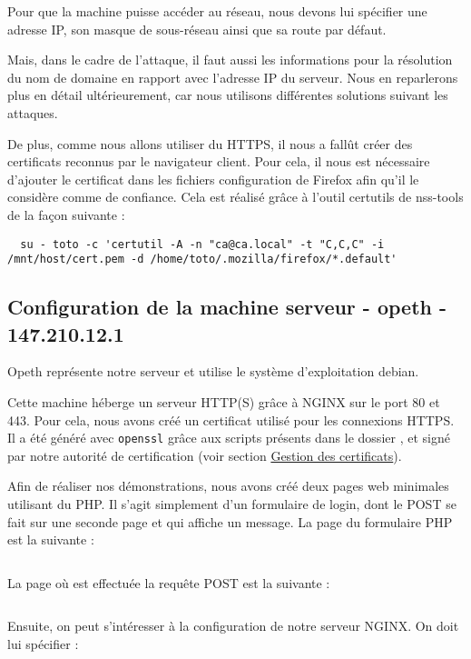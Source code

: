 Pour que la machine puisse accéder au réseau, nous devons lui spécifier une adresse IP, son masque de sous-réseau ainsi que sa route par défaut.

Mais, dans le cadre de l'attaque, il faut aussi les informations pour la résolution du nom de domaine en rapport avec l'adresse IP du serveur. Nous en reparlerons plus en détail ultérieurement, car nous utilisons différentes solutions suivant les attaques.

De plus, comme nous allons utiliser du HTTPS, il nous a fallût créer des certificats reconnus par le navigateur client. Pour cela, il nous est nécessaire d'ajouter le certificat dans les fichiers configuration de Firefox afin qu'il le considère comme de confiance. Cela est réalisé grâce à l'outil certutils de nss-tools de la façon suivante :

\begin{verbatim}
  su - toto -c 'certutil -A -n "ca@ca.local" -t "C,C,C" -i /mnt/host/cert.pem -d /home/toto/.mozilla/firefox/*.default'
\end{verbatim}

\subsection{Configuration de la machine serveur - opeth - 147.210.12.1}

Opeth représente notre serveur et utilise le système d'exploitation debian.

Cette machine héberge un serveur HTTP(S) grâce à NGINX sur le port 80 et 443. Pour cela, nous avons créé un certificat utilisé pour les connexions HTTPS. Il a été généré avec \verb+openssl+ grâce aux scripts présents dans le dossier , et signé par notre autorité de certification (voir section \hyperref[sec:certificats]{Gestion des certificats}).

Afin de réaliser nos démonstrations, nous avons créé deux pages web minimales utilisant du PHP. Il s'agit simplement d'un formulaire de login, dont le POST se fait sur une seconde page et qui affiche un message. La page du formulaire PHP est la suivante :

\inputminted[bgcolor=lbcolor, breaklines]{html}{../sslstrip2/opeth/www/local/index.php}

La page où est effectuée la requête POST est la suivante :

\inputminted[bgcolor=lbcolor, breaklines]{php}{../sslstrip2/opeth/www/secure/index.php}

Ensuite, on peut s'intéresser à la configuration de notre serveur NGINX. On doit lui spécifier :

